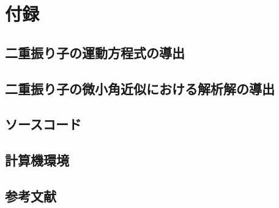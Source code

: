 \documentclass[a4paper,11pt]{jsarticle}
\begin{document}
\newpage
\section{付録}
\subsection{二重振り子の運動方程式の導出}

\newpage
\subsection{二重振り子の微小角近似における解析解の導出}

\newpage
\subsection{ソースコード}

\newpage

\newpage

\newpage
\subsection{計算機環境}
\subsection{参考文献}
\end{document}
